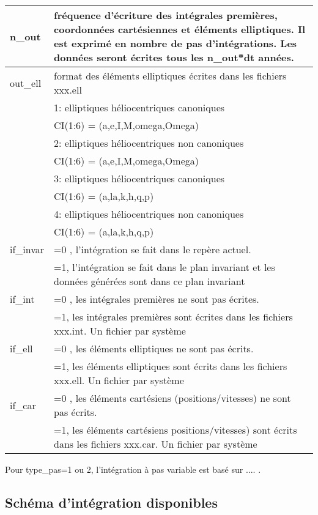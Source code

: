 \documentclass[11pt]{article}
\begin{document}
\begin{tabularx}{\textwidth}{|l|X|}
 n\_out & fr\'equence d'\'ecriture des int\'egrales premi\`eres, coordonn\'ees cart\'esiennes et \'el\'ements elliptiques. Il est exprim\'e en nombre de pas d'int\'egrations. Les donn\'ees seront \'ecrites tous les n\_out*dt ann\'ees.
 \\ \hline
 out\_ell & format des \'el\'ements elliptiques \'ecrites dans les fichiers xxx.ell \\
&1:  elliptiques h\'eliocentriques canoniques\\
&	     CI(1:6) = (a,e,I,M,omega,Omega)\\
&2:  elliptiques h\'eliocentriques non canoniques\\
&	     CI(1:6) = (a,e,I,M,omega,Omega)\\
&3:  elliptiques h\'eliocentriques canoniques\\
&	     CI(1:6) = (a,la,k,h,q,p)\\
&4:  elliptiques h\'eliocentriques non canoniques\\
&	     CI(1:6) = (a,la,k,h,q,p)\\ \hline
 if\_invar & =0 , l'int\'egration se fait dans le rep\`ere actuel. \\
& =1, l'int\'egration se fait dans le plan invariant et les donn\'ees g\'en\'er\'ees sont dans ce plan invariant 
\\ \hline

 if\_int & =0 , les int\'egrales premi\`eres ne sont pas \'ecrites.\\
&=1, les int\'egrales premi\`eres sont \'ecrites dans les fichiers xxx.int. Un fichier par syst\`eme\\ \hline
 
 if\_ell & =0 , les \'el\'ements elliptiques ne sont pas \'ecrits.\\
&=1, les \'el\'ements elliptiques sont \'ecrits dans les fichiers xxx.ell. Un fichier par syst\`eme\\ \hline
 
 if\_car &  =0 , les \'el\'ements cart\'esiens (positions/vitesses) ne sont pas \'ecrits.\\
&=1, les \'el\'ements cart\'esiens positions/vitesses) sont \'ecrits dans les fichiers xxx.car. Un fichier par syst\`eme\\ \hline 
 \end{tabularx}


Pour type\_pas=1 ou 2, l'int\'egration \`a pas variable est bas\'e sur .... . 

\subsection{Sch\'ema d'intégration disponibles}\label{autresschemas}
\end{document}
